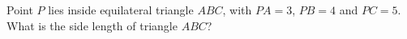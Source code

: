 Point $P$ lies inside equilateral triangle $ABC$, with $PA=3$, $PB=4$ and $PC=5$. What is the side length of triangle $ABC$?
